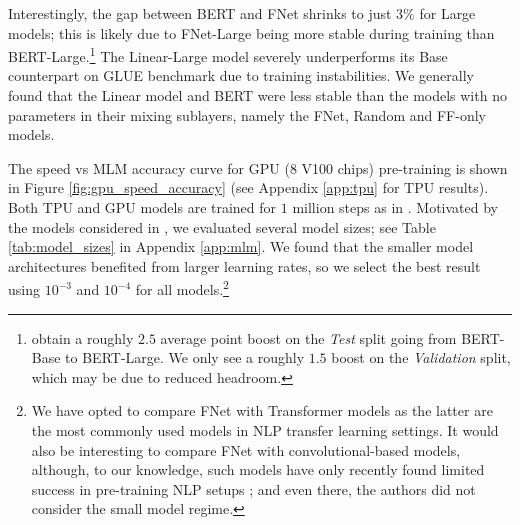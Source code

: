 Interestingly, the gap between BERT and FNet shrinks to just $3\%$ for Large models; this is likely due to FNet-Large being more stable during training than BERT-Large.\footnote{\citet{devlin2018bert} obtain a roughly $2.5$ average point boost on the \emph{Test} split going from BERT-Base to BERT-Large. We only see a roughly $1.5$ boost on the \emph{Validation} split, which may be due to reduced headroom.} The Linear-Large model severely underperforms its Base counterpart on GLUE benchmark due to training instabilities. We generally found that the Linear model and BERT were less stable than the models with no parameters in their mixing sublayers, namely the FNet, Random and FF-only models.

The speed vs MLM accuracy curve for GPU ($8$ V100 chips) pre-training is shown in Figure \ref{fig:gpu_speed_accuracy} (see Appendix \ref{app:tpu} for TPU results). Both TPU and GPU models are trained for $1$ million steps as in \citet{devlin2018bert}. Motivated by the models considered in \citet{turc2019well}, we evaluated several model sizes; see Table \ref{tab:model_sizes} in Appendix \ref{app:mlm}. We found that the smaller model architectures benefited from larger learning rates, so we select the best result using $10^{-3}$ and $10^{-4}$ for all models.\footnote{We have opted to compare FNet with Transformer models as the latter are the most commonly used models in NLP transfer learning settings. It would also be interesting to compare FNet with convolutional-based models, although, to our knowledge, such models have only recently found limited success in pre-training NLP setups \citep{tay2021pre}; and even there, the authors did not consider the small model regime.}


